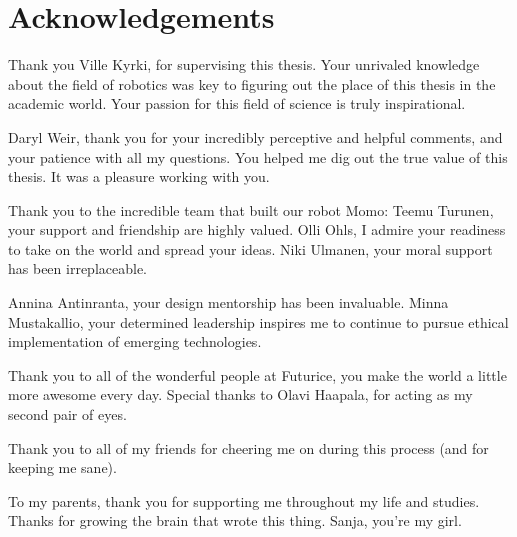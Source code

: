 \documentclass[12pt,a4paper,oneside,pdftex]{report}
\begin{document}


\chapter*{Acknowledgements}


\noindent Thank you Ville Kyrki, for supervising this thesis. Your unrivaled knowledge about the field of robotics was key to figuring out the place of this thesis in the academic world. Your passion for this field of science is truly inspirational.

\vskip 3mm

\noindent Daryl Weir, thank you for your incredibly perceptive and helpful comments, and your patience with all my questions. You helped me dig out the true value of this thesis. It was a pleasure working with you.

\vskip 3mm

\noindent Thank you to the incredible team that built our robot Momo: Teemu Turunen, your support and friendship are highly valued. Olli Ohls, I admire your readiness to take on the world and spread your ideas. Niki Ulmanen, your moral support has been irreplaceable.

\vskip 3mm

\noindent Annina Antinranta, your design mentorship has been invaluable. Minna Mustakallio, your determined leadership inspires me to continue to pursue ethical implementation of emerging technologies.

\vskip 3mm

\noindent Thank you to all of the wonderful people at Futurice, you make the world a little more awesome every day. Special thanks to Olavi Haapala, for acting as my second pair of eyes.

\vskip 3mm

\noindent Thank you to all of my friends for cheering me on during this process (and for keeping me sane).

\vskip 3mm

\noindent To my parents, thank you for supporting me throughout my life and studies. Thanks for growing the brain that wrote this thing. Sanja, you're my girl.
\end{document}
